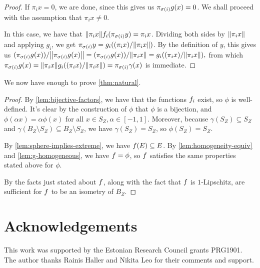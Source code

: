 \documentclass{amsart}
\theoremstyle{definition}
\begin{document}
\begin{proof}
	If $\pi_i x = 0$, we are done, since this gives us
	$\pi_{\sigma(i)} g(x) = 0$. We shall proceed with the assumption that
  $\pi_i x \neq 0$.

	In this case, we have that
  $\norm{\pi_i x}f_i (\pi_{\sigma(i)} y) = \pi_i x$.
	Dividing both sides by $\norm{\pi_i x}$ and applying $g_i$, we get
	$\pi_{\sigma(i)} y = g_i ((\pi_i x)/\norm{\pi_i x})$.
	By the definition of $y$, this gives us
  $ (\pi_{\sigma(i)} g(x))/\norm{\pi_{\sigma(i)} g(x)} = (\pi_{\sigma(i)} g(x))/\norm{\pi_i x} = g_i ((\pi_i x)/\norm{\pi_i x}), $
	from which
	$\pi_{\sigma(i)} g(x) = \norm{\pi_i x}g_i ((\pi_i x)/\norm{\pi_i x}) = \pi_{\sigma(i)} \gamma(x)$
	is immediate.
\end{proof}

We now have enough to prove \autoref{thm:natural}.

\begin{proof} 

  By \autoref{lem:bijective-factors}, we have that the functions $f_i$ exist,
  so $\phi$ is well-defined.
  It's clear by the construction of $\phi$ that $\phi$ is a bijection, and $\phi(\alpha x) = \alpha \phi(x)$
  for all $x \in S_Z, \alpha \in [-1,1]$. Moreover, because $\gamma(S_Z) \subseteq S_Z$ and $\gamma(B_Z\setminus S_Z) \subseteq B_Z \setminus S_Z$, we have $\gamma(S_Z) = S_Z$, so $\phi(S_Z) = S_Z$.

  

  By \autoref{lem:sphere-implies-extreme}, we have $f(E) \subseteq E$.
  By \autoref{lem:homogeneity-equiv} and \autoref{lem:g-homogeneous}, we have $f = \phi$,
  so $f$ satisfies the same properties stated above for $\phi$.

By \autocite[Lemma 2.5]{cascales:2016}
  the facts just stated about $f$, along with the fact that $f$ is $1$‑Lipschitz, are sufficient for $f$ to be an isometry of $B_Z$.
\end{proof}


\section*{Acknowledgements}

This work was supported by the Estonian Research Council grants PRG1901. The author thanks Rainis Haller and Nikita Leo for their comments and support.


\printbibliography
\end{document}
